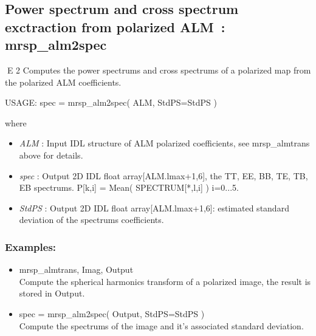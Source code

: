 \subsection{Power spectrum and cross spectrum exctraction from polarized ALM~: mrsp\_alm2spec}
E 2
Computes the power spectrums and cross spectrums of a polarized map from the polarized ALM coefficients.
{\bf
\begin{center}
     USAGE: spec = mrsp\_alm2spec( ALM, StdPS=StdPS )
\end{center}}
where
\begin{itemize}
\item {\em ALM} : Input IDL structure of ALM polarized coefficients, see mrsp\_almtrans above for details.
\item {\em spec} : Output 2D IDL float array[ALM.lmax+1,6], the TT, EE, BB, TE, TB, EB spectrums. P[k,i] = Mean( SPECTRUM[*,l,i] ) \quad i=0...5.
\item {\em StdPS} : Output 2D IDL float array[ALM.lmax+1,6]: estimated standard deviation of the spectrums coefficients.
\end{itemize}

\subsubsection*{Examples:} 
\begin{itemize}
\item mrsp\_almtrans, Imag, Output \\
Compute the spherical harmonics transform of a polarized image, the result is stored in Output.
\item spec = mrsp\_alm2spec( Output, StdPS=StdPS ) \\
Compute the spectrums of the image and it's associated standard deviation.
\end{itemize}



